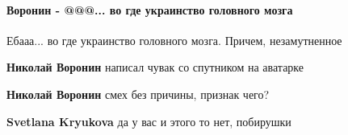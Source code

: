  
 
 
 
 
\paragraph{Воронин - @@@... во где украинство головного мозга}

\begin{itemize}

 

Ебааа... во где украинство головного мозга. Причем, незамутненное 🤣🤣🤣

\begin{itemize}

 
\textbf{Николай Воронин} написал чувак со спутником на аватарке

 
\textbf{Николай Воронин} смех без причины, признак чего?

 
\textbf{Svetlana Kryukova} да у вас и этого то нет, побирушки 🤣


\end{itemize}
\end{itemize}
